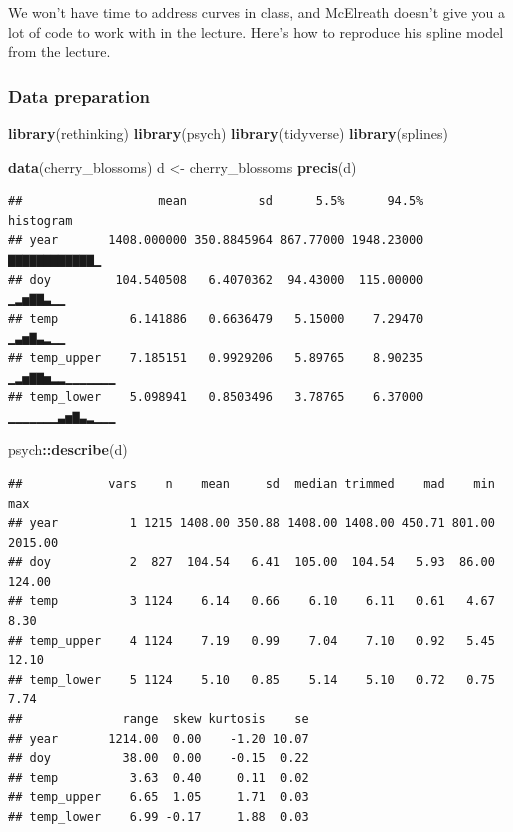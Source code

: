\documentclass[
]{book}
\newenvironment{Shaded}{\begin{snugshade}}{\end{snugshade}}
\newcommand{\FunctionTok}[1]{\textcolor[rgb]{0.13,0.29,0.53}{\textbf{#1}}}
\newcommand{\NormalTok}[1]{#1}
\newcommand{\OtherTok}[1]{\textcolor[rgb]{0.56,0.35,0.01}{#1}}
\newcommand{\SpecialCharTok}[1]{\textcolor[rgb]{0.81,0.36,0.00}{\textbf{#1}}}
\begin{document}
We won't have time to address curves in class, and McElreath doesn't give you a lot of code to work with in the lecture. Here's how to reproduce his spline model from the lecture.

\subsubsection{Data preparation}\label{data-preparation}

\begin{Shaded}
\begin{Highlighting}[]
\FunctionTok{library}\NormalTok{(rethinking)}
\FunctionTok{library}\NormalTok{(psych)}
\FunctionTok{library}\NormalTok{(tidyverse)}
\FunctionTok{library}\NormalTok{(splines)}
\end{Highlighting}
\end{Shaded}

\begin{Shaded}
\begin{Highlighting}[]
\FunctionTok{data}\NormalTok{(cherry\_blossoms)}
\NormalTok{d }\OtherTok{\textless{}{-}}\NormalTok{ cherry\_blossoms}
\FunctionTok{precis}\NormalTok{(d)}
\end{Highlighting}
\end{Shaded}

\begin{verbatim}
##                   mean          sd      5.5%      94.5%       histogram
## year       1408.000000 350.8845964 867.77000 1948.23000   ▇▇▇▇▇▇▇▇▇▇▇▇▁
## doy         104.540508   6.4070362  94.43000  115.00000        ▁▂▅▇▇▃▁▁
## temp          6.141886   0.6636479   5.15000    7.29470        ▁▃▅▇▃▂▁▁
## temp_upper    7.185151   0.9929206   5.89765    8.90235 ▁▂▅▇▇▅▂▂▁▁▁▁▁▁▁
## temp_lower    5.098941   0.8503496   3.78765    6.37000 ▁▁▁▁▁▁▁▃▅▇▃▂▁▁▁
\end{verbatim}

\begin{Shaded}
\begin{Highlighting}[]
\NormalTok{psych}\SpecialCharTok{::}\FunctionTok{describe}\NormalTok{(d)}
\end{Highlighting}
\end{Shaded}

\begin{verbatim}
##            vars    n    mean     sd  median trimmed    mad    min     max
## year          1 1215 1408.00 350.88 1408.00 1408.00 450.71 801.00 2015.00
## doy           2  827  104.54   6.41  105.00  104.54   5.93  86.00  124.00
## temp          3 1124    6.14   0.66    6.10    6.11   0.61   4.67    8.30
## temp_upper    4 1124    7.19   0.99    7.04    7.10   0.92   5.45   12.10
## temp_lower    5 1124    5.10   0.85    5.14    5.10   0.72   0.75    7.74
##              range  skew kurtosis    se
## year       1214.00  0.00    -1.20 10.07
## doy          38.00  0.00    -0.15  0.22
## temp          3.63  0.40     0.11  0.02
## temp_upper    6.65  1.05     1.71  0.03
## temp_lower    6.99 -0.17     1.88  0.03
\end{verbatim}
\end{document}
